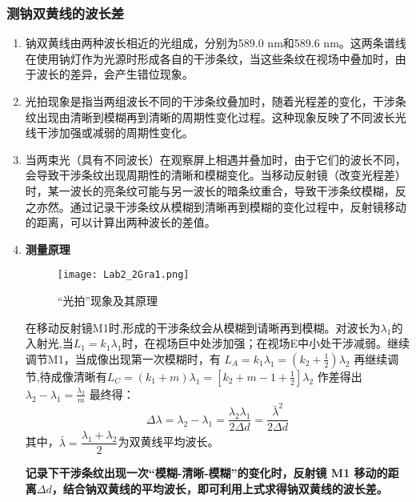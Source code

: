 \documentclass[dvipsnames, svgnames,a4paper,11pt]{article}
\begin{document}
	\subsubsection{测钠双黄线的波长差}
	\begin{enumerate}
		\item 钠双黄线由两种波长相近的光组成，分别为589.0 nm和589.6 nm。这两条谱线在使用钠灯作为光源时形成各自的干涉条纹，当这些条纹在视场中叠加时，由于波长的差异，会产生错位现象。
		\item 光拍现象是指当两组波长不同的干涉条纹叠加时，随着光程差的变化，干涉条纹出现由清晰到模糊再到清晰的周期性变化过程。这种现象反映了不同波长光线干涉加强或减弱的周期性变化。
		\item 当两束光（具有不同波长）在观察屏上相遇并叠加时，由于它们的波长不同，会导致干涉条纹出现周期性的清晰和模糊变化。当移动反射镜（改变光程差）时，某一波长的亮条纹可能与另一波长的暗条纹重合，导致干涉条纹模糊，反之亦然。通过记录干涉条纹从模糊到清晰再到模糊的变化过程中，反射镜移动的距离，可以计算出两种波长的差值。
		\item \textbf{测量原理}
		
		\begin{figure}[htbp]
			\centering
			\texttt{[image: Lab2\_2Gra1.png]}
			\caption{“光拍”现象及其原理}
			\label{fig:fig1}
		\end{figure}
		
		在移动反射镜M1时,形成的干涉条纹会从模糊到请晰再到模糊。对波长为$\lambda_{1}$的入射光,当$L_{1}=k_{1}\lambda_{1}$时，在视场巨中处涉加强；在视场E中小处干涉减弱。继续调节M1，当成像出现第一次模糊时，有
		$L _{A}=k_{1}\lambda_{1}=(k_{2}+\frac{1}{2})\lambda_{2}$
		再继续调节,待成像清晰有$L_{C}=(k_{1}+m)\lambda_{1}=[k_{2}+m-1+\frac{1}{2}]\lambda_{2}$
		作差得出$\lambda_{2}-\lambda_{1}=\frac{\lambda_{2}}{m}$
		最终得：
		\[\Delta\lambda=\lambda_{2}-\lambda_{1}=\frac{\lambda_{2}\lambda_{1}}{2\Delta d}=\frac{\bar{\lambda}^{2}}{2\Delta d}\]
		其中，$\bar{\lambda}=\dfrac{\lambda_1+\lambda_2}{2}$为双黄线平均波长。
		
		\textbf{记录下干涉条纹出现一次“模糊-清晰-模糊”的变化时，反射镜 M1 移动的距离$\Delta d$，结合钠双黄线的平均波长，即可利用上式求得钠双黄线的波长差。}
	\end{enumerate}
\end{document}
